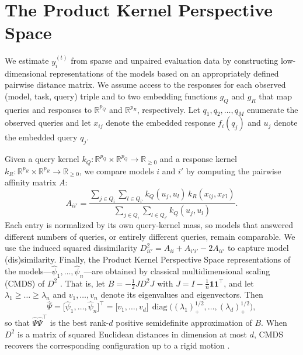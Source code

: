 \documentclass{article}
\theoremstyle{definition}
\theoremstyle{plain}
\begin{document}
\section{The Product Kernel Perspective Space}
\label{sec:method}

We estimate $y_i^{(t)}$ from sparse and unpaired
evaluation data by constructing low-dimensional
representations of the models based on an appropriately defined pairwise distance
matrix.
We assume access to the responses for each observed (model, task, query) triple and
to two embedding functions $g_{Q}$ and $g_{R}$ that map
queries and responses to $\mathbb{R}^{p_{Q}}$ and $\mathbb{R}^{p_{R}}$, respectively.
Let $q_{1},q_{2},\hdots, q_{M} $ enumerate the observed queries and let
$x_{ij}$ denote the embedded response $f_{i}(q_{j})$ and $u_{j}$ denote the embedded
query $q_{j}$.

Given a query kernel
$k_Q:\mathbb{R}^{p_{Q}}\times\mathbb{R}^{p_{Q}}\to\mathbb{R}_{\ge0}$ and a response
kernel $k_R:\mathbb{R}^{p_{R}}\times\mathbb{R}^{p_{R}}\to\mathbb{R}_{\ge0}$, we
compare models $i$ and $i'$ by computing the pairwise affinity matrix $ A $:
\begin{equation}
A_{ii'} = \frac{\sum_{j\in Q_i}\sum_{l\in Q_{i'}} k_Q(u_j,u_l)\, k_R(x_{ij},x_{i'l})}
              {\sum_{j\in Q_i}\sum_{l\in Q_{i'}} k_Q(u_j,u_l)}.
\label{eq:A}
\end{equation}
Each entry is normalized by its own query-kernel mass, so models that answered
different numbers of queries, or entirely different queries, remain comparable.
We use the induced squared dissimilarity $D^2_{ii'}=A_{ii}+A_{i'i'}-2A_{ii'}$ to
capture model (dis)similarity.
Finally, the Product Kernel Perspective Space representations of the
models---$\widehat{\psi}_{1},\hdots,\widehat{\psi}_{n}$---are obtained by classical
multidimensional scaling (CMDS) of $D^2$ \citep{torgerson1952mds, borg2005modern}.
That is, let $B=-\tfrac12 J D^2 J$ with $J=I-\tfrac1n\mathbf{1}\mathbf{1}^\top$, and let
$\lambda_1\ge\dots\ge\lambda_n$ and $v_1,\dots,v_n$ denote its eigenvalues and
eigenvectors. Then
\begin{equation}
\widehat{\Psi}=\big[\hat\psi_1,\dots,\hat\psi_n\big]^\top
=\big[v_1,\dots,v_d\big]\,\operatorname{diag}\!\big((\lambda_1)_+^{1/2},\dots,(\lambda_d)_+^{1/2}\big),
\label{eq:mds}
\end{equation}
so that $\widehat{\Psi}\widehat{\Psi}^\top$ is the best rank-$d$ positive semidefinite
approximation of $B$.
When $D^2$ is a matrix of squared Euclidean distances in dimension at most $d$, CMDS
recovers the corresponding configuration up to a rigid motion \citep{Dokmanic_2015}.
\end{document}
